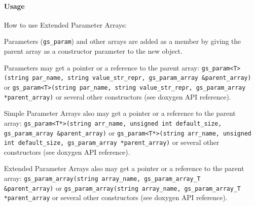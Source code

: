 \paragraph{Usage} How to use Extended Parameter Arrays:\newline

Parameters (\lstinline|gs_param|) and other arrays are added as a member by giving the parent array as a constructor parameter to the new object.

Parameters may get a pointer or a reference to the parent array: \newline
    	\lstinline|gs_param<T>(string par_name, string value_str_repr, gs_param_array &parent_array)| or \newline
    	\lstinline|gs_param<T>(string par_name, string value_str_repr, gs_param_array *parent_array)| or \newline
	several other constructors (see doxygen API reference).

Simple Parameter Arrays also may get a pointer or a reference to the parent array: \newline
    	\lstinline|gs_param<T*>(string arr_name, unsigned int default_size, gs_param_array &parent_array)| or \newline
    	\lstinline|gs_param<T*>(string arr_name, unsigned int default_size, gs_param_array *parent_array)| or \newline
	several other constructors (see doxygen API reference).

Extended Parameter Arrays also may get a pointer or a reference to the parent array: \newline
	\lstinline|gs_param_array(string array_name, gs_param_array_T &parent_array)| or \newline
	\lstinline|gs_param_array(string array_name, gs_param_array_T *parent_array| or \newline
	several other constructors (see doxygen API reference).

\vspace{.5cm}

